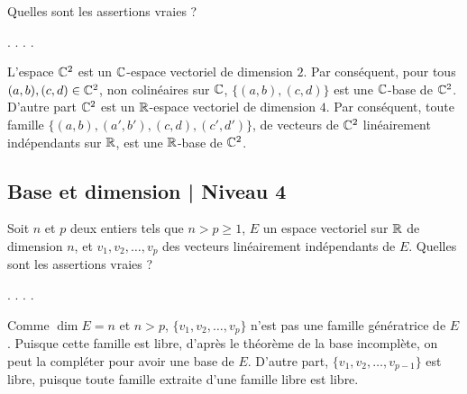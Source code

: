 \begin{question}
Quelles sont les assertions vraies ?
\begin{answers}  
.
.
.
.
\end{answers}
\begin{explanations} L'espace $\mathbb{C}^2$ est un $\mathbb{C}$-espace vectoriel de dimension $2$. Par conséquent, pour tous $(a,b), (c,d) \in \mathbb{C}^2$, non colinéaires sur $\mathbb{C}$, $\{(a,b), (c,d)\}$ est une $\mathbb{C}$-base de $\mathbb{C}^2$.
\vskip2mm
D'autre part $\mathbb{C}^2$ est un  $\mathbb{R}$-espace vectoriel de dimension $4$. Par conséquent, toute famille $\{(a,b), (a',b'), (c,d), (c',d')\}$, de vecteurs de $\mathbb{C}^2$ linéairement indépendants sur $\mathbb{R}$, est une $\mathbb{R}$-base de $\mathbb{C}^2$.
\end{explanations}
\end{question}

\subsection{Base et dimension | Niveau 4}

\begin{question}
Soit $n$ et $p$ deux entiers  tels que $n >p \ge 1$, $E$ un espace vectoriel sur $\mathbb{R}$ de dimension $n$, et $v_1,v_2, \dots, v_p$ des vecteurs linéairement indépendants de $E$. Quelles sont les assertions vraies ?
\begin{answers}  
.
.
.
.
\end{answers}
\begin{explanations} Comme $\dim E=n$ et $n>p$, $\{v_1,v_2, \dots, v_p\}$ n'est pas une famille génératrice de $E$. Puisque cette famille est libre, d'après le théorème de la base incomplète, on peut la compléter pour avoir une base de $E$.
\vskip2mm
D'autre part, $\{v_1,v_2, \dots, v_{p-1}\}$ est libre, puisque toute famille extraite d'une famille libre est libre.
\end{explanations}
\end{question}

